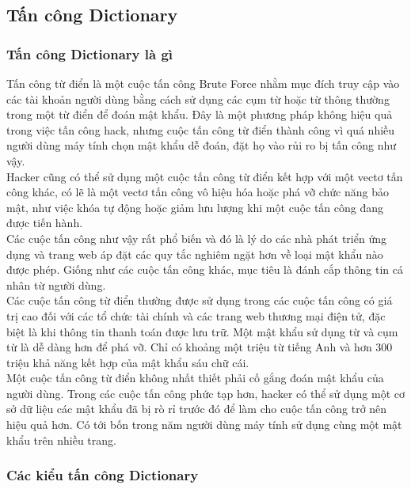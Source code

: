\subsection{ Tấn công Dictionary}
\subsubsection{ Tấn công Dictionary là gì}
Tấn công từ điển là một cuộc tấn công Brute Force nhằm mục đích truy cập vào các tài khoản người dùng bằng cách sử dụng các cụm từ hoặc từ thông thường trong một từ điển để đoán mật khẩu. Đây là một phương pháp không hiệu quả trong việc tấn công hack, nhưng cuộc tấn công từ điển thành công vì quá nhiều người dùng máy tính chọn mật khẩu dễ đoán, đặt họ vào rủi ro bị tấn công như vậy.\\

Hacker cũng có thể sử dụng một cuộc tấn công từ điển kết hợp với một vectơ tấn công khác, có lẽ là một vectơ tấn công vô hiệu hóa hoặc phá vỡ chức năng bảo mật, như việc khóa tự động hoặc giảm lưu lượng khi một cuộc tấn công đang được tiến hành.\\

Các cuộc tấn công như vậy rất phổ biến và đó là lý do các nhà phát triển ứng dụng và trang web áp đặt các quy tắc nghiêm ngặt hơn về loại mật khẩu nào được phép. Giống như các cuộc tấn công khác, mục tiêu là đánh cắp thông tin cá nhân từ người dùng.\\

Các cuộc tấn công từ điển thường được sử dụng trong các cuộc tấn công có giá trị cao đối với các tổ chức tài chính và các trang web thương mại điện tử, đặc biệt là khi thông tin thanh toán được lưu trữ. Một mật khẩu sử dụng từ và cụm từ là dễ dàng hơn để phá vỡ. Chỉ có khoảng một triệu từ tiếng Anh và hơn 300 triệu khả năng kết hợp của mật khẩu sáu chữ cái.\\

Một cuộc tấn công từ điển không nhất thiết phải cố gắng đoán mật khẩu của người dùng. Trong các cuộc tấn công phức tạp hơn, hacker có thể sử dụng một cơ sở dữ liệu các mật khẩu đã bị rò rỉ trước đó để làm cho cuộc tấn công trở nên hiệu quả hơn. Có tới bốn trong năm người dùng máy tính sử dụng cùng một mật khẩu trên nhiều trang.

\subsubsection{Các kiểu tấn công Dictionary}

